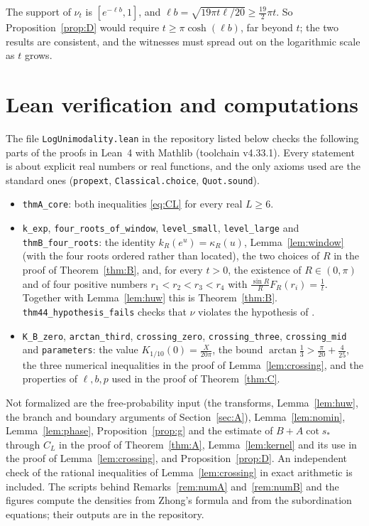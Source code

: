 \documentclass[11pt]{amsart}
\theoremstyle{remark}
\begin{document}
The support of $\nu_t$ is $[e^{-\ell b},1]$, and $\ell b=\sqrt{19\pi t\ell/20}\ge\frac{19}{2}\pi t$. So Proposition~\ref{prop:D} would require $t\ge\pi\cosh(\ell b)$, far beyond $t$; the two results are consistent, and the witnesses must spread out on the logarithmic scale as $t$ grows.

\section{Lean verification and computations}\label{sec:lean}

The file \texttt{LogUnimodality.lean} in the repository listed below checks the following parts of the proofs in Lean~4 \cite{Lean} with Mathlib \cite{Mathlib} (toolchain v4.33.1). Every statement is about explicit real numbers or real functions, and the only axioms used are the standard ones (\texttt{propext}, \texttt{Classical.choice}, \texttt{Quot.sound}).
\begingroup\sloppy
\begin{itemize}
\item \texttt{thmA\_core}: both inequalities \eqref{eq:CL} for every real $L\ge6$.
\item \texttt{k\_exp}, \texttt{four\_roots\_of\_window}, \texttt{level\_small}, \texttt{level\_large} and \texttt{thmB\_four\_roots}: the identity $k_R(e^u)=\kappa_R(u)$, Lemma~\ref{lem:window} (with the four roots ordered rather than located), the two choices of $R$ in the proof of Theorem~\ref{thm:B}, and, for every $t>0$, the existence of $R\in(0,\pi)$ and of four positive numbers $r_1<r_2<r_3<r_4$ with $\frac{\sin R}{R}F_R(r_i)=\frac1t$. Together with Lemma~\ref{lem:huw} this is Theorem~\ref{thm:B}. \texttt{thm44\_hypothesis\_fails} checks that $\nu$ violates the hypothesis of \cite[Theorem~4.4]{HUW}.
\item \texttt{K\_B\_zero}, \texttt{arctan\_third}, \texttt{crossing\_zero}, \texttt{crossing\_three}, \texttt{crossing\_mid} and \texttt{parameters}: the value $K_{1/10}(0)=\frac{X}{20\pi}$, the bound $\arctan\frac13>\frac\pi{20}+\frac4{25}$, the three numerical inequalities in the proof of Lemma~\ref{lem:crossing}, and the properties of $\ell,b,p$ used in the proof of Theorem~\ref{thm:C}.
\end{itemize}
\endgroup
Not formalized are the free-probability input (the transforms, Lemma~\ref{lem:huw}, the branch and boundary arguments of Section~\ref{sec:A}), Lemma~\ref{lem:nomin}, Lemma~\ref{lem:phase}, Proposition~\ref{prop:g} and the estimate of $B+A\cot s_*$ through $C_L$ in the proof of Theorem~\ref{thm:A}, Lemma~\ref{lem:kernel} and its use in the proof of Lemma~\ref{lem:crossing}, and Proposition~\ref{prop:D}. An independent check of the rational inequalities of Lemma~\ref{lem:crossing} in exact arithmetic is included. The scripts behind Remarks~\ref{rem:numA} and~\ref{rem:numB} and the figures compute the densities from Zhong's formula and from the subordination equations; their outputs are in the repository.
\end{document}
